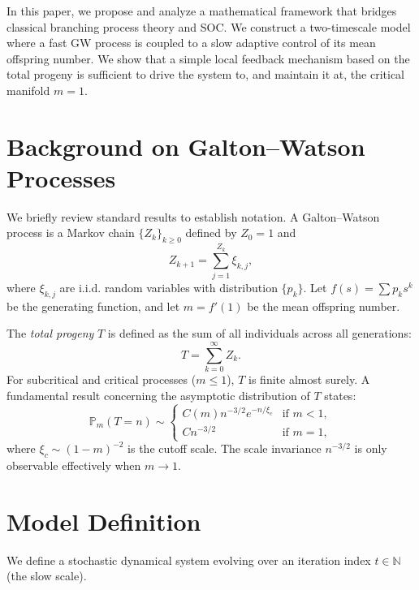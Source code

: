 \documentclass[11pt, a4paper]{article}
\theoremstyle{definition}
\renewcommand{\P}{\mathbb{P}}
\newcommand{\N}{\mathbb{N}}
\begin{document}
In this paper, we propose and analyze a mathematical framework that bridges classical branching process theory and SOC. We construct a two-timescale model where a fast GW process is coupled to a slow adaptive control of its mean offspring number. We show that a simple local feedback mechanism based on the total progeny is sufficient to drive the system to, and maintain it at, the critical manifold $m=1$.

\section{Background on Galton--Watson Processes}

We briefly review standard results to establish notation. A Galton--Watson process is a Markov chain $\{Z_k\}_{k \ge 0}$ defined by $Z_0 = 1$ and
\begin{equation}
    Z_{k+1} = \sum_{j=1}^{Z_k} \xi_{k,j},
\end{equation}
where $\xi_{k,j}$ are i.i.d. random variables with distribution $\{p_k\}$. Let $f(s) = \sum p_k s^k$ be the generating function, and let $m = f'(1)$ be the mean offspring number.

The \textit{total progeny} $T$ is defined as the sum of all individuals across all generations:
\begin{equation}
    T = \sum_{k=0}^{\infty} Z_k.
\end{equation}
For subcritical and critical processes ($m \le 1$), $T$ is finite almost surely.
A fundamental result concerning the asymptotic distribution of $T$ states:
\begin{equation}
    \P_m(T = n) \sim \begin{cases} 
    C(m) n^{-3/2} e^{-n/\xi_c} & \text{if } m < 1, \\
    C n^{-3/2} & \text{if } m = 1,
    \end{cases}
\end{equation}
where $\xi_c \sim (1-m)^{-2}$ is the cutoff scale. The scale invariance $n^{-3/2}$ is only observable effectively when $m \to 1$.

\section{Model Definition}

We define a stochastic dynamical system evolving over an iteration index $t \in \N$ (the slow scale).
\end{document}
